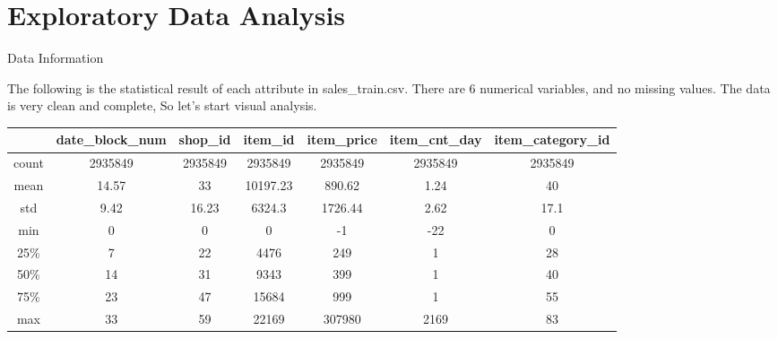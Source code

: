 \documentclass[
 size=12pt,
 paper=smartboard, %
 mode=present, %
 display=slides, %
 style=tuliplab,  %
 pauseslide,
 fleqn,leqno,clock]{powerdot}
\begin{document}
\section{Exploratory Data Analysis}
%
\begin{slide}{Data Information}
	\begin{center}
		The following 	is the statistical
		result of each attribute in sales\_train.csv.
		There are 6 numerical variables,
		and no missing values.
		The data is very clean and complete, So let's start visual
		analysis.
	\end{center}
	\begin{tabular}{ccccccc}
		\hline
		        & date\_block\_num & shop\_id & item\_id & item\_price &
		item\_cnt\_day
		        &
		item\_category\_id
		\\
		\hline
		count   & 2935849          & 2935849  & 2935849  & 2935849     &
		2935849 & 2935849                                                \\
		mean    & 14.57            & 33       & 10197.23 & 890.62      &
		1.24    & 40                                                     \\
		std     & 9.42             & 16.23    & 6324.3   & 1726.44     &
		2.62    & 17.1                                                   \\
		min     & 0                & 0        & 0        & -1          &
		-22     & 0                                                      \\
		25\%    & 7                & 22       & 4476     & 249         &
		1       & 28                                                     \\
		50\%    & 14               & 31       & 9343     & 399         &
		1       & 40                                                     \\
		75\%    & 23               & 47       & 15684    & 999         &
		1       & 55                                                     \\
		max     & 33               & 59       & 22169    & 307980      &
		2169    & 83                                                     \\
		\hline
	\end{tabular}
\end{slide}
\end{document}
